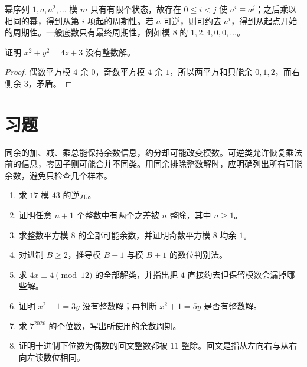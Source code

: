 幂序列 $1,a,a^2,\ldots$ 模 $m$ 只有有限个状态，故存在 $0\le i<j$ 使 $a^i\equiv a^j$；之后乘以相同的幂，得到从第 $i$ 项起的周期性。若 $a$ 可逆，则可约去 $a^i$，得到从起点开始的周期性。一般底数只有最终周期性，例如模 $8$ 的 $1,2,4,0,0,\ldots$。

\begin{example}
证明 $x^2+y^2=4z+3$ 没有整数解。
\end{example}
\begin{proof}
偶数平方模 $4$ 余 $0$，奇数平方模 $4$ 余 $1$，所以两平方和只能余 $0,1,2$，而右侧余 $3$，矛盾。
\end{proof}

\section{习题}

同余的加、减、乘总能保持余数信息，约分却可能改变模数。可逆类允许恢复乘法前的信息，零因子则可能合并不同类。用同余排除整数解时，应明确列出所有可能余数，避免只检查几个样本。

\begin{enumerate}
 \item 求 $17$ 模 $43$ 的逆元。
 \item 证明任意 $n+1$ 个整数中有两个之差被 $n$ 整除，其中 $n\ge1$。
 \item 求整数平方模 $8$ 的全部可能余数，并证明奇数平方模 $8$ 均余 $1$。
 \item 对进制 $B\ge2$，推导模 $B-1$ 与模 $B+1$ 的数位判别法。
 \item\label{ex:cong-cancel} 求 $4x\equiv4\pmod{12}$ 的全部解类，并指出把 $4$ 直接约去但保留模数会漏掉哪些解。
 \item\label{ex:cong-obstruction} 证明 $x^2+1=3y$ 没有整数解；再判断 $x^2+1=5y$ 是否有整数解。
 \item\label{ex:cong-last-digit} 求 $7^{2026}$ 的个位数，写出所使用的余数周期。
 \item\label{ex:cong-palindrome} 证明十进制下位数为偶数的回文整数都被 $11$ 整除。回文是指从左向右与从右向左读数位相同。
\end{enumerate}

